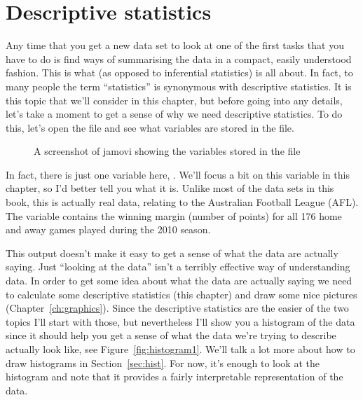 
\chapter{Descriptive statistics\label{ch:descriptives}}

Any time that you get a new data set to look at one of the first tasks that you have to do is find ways of summarising the data in a compact, easily understood fashion. This is what  (as opposed to inferential statistics) is all about. In fact, to many people the term ``statistics'' is synonymous with descriptive statistics. It is this topic that we'll consider in this chapter, but before going into any details, let's take a moment to get a sense of why we need descriptive statistics. To do this, let's open the  file and see what variables are stored in the file.

\vspace{0.5cm}
\begin{figure}[htb]
\begin{center}
\caption{A screenshot of jamovi showing the variables stored in the  file}
\label{fig:aflsmall}
\HR
\end{center}
\end{figure}

In fact, there is just one variable here, . We'll focus a bit on this variable in this chapter, so I'd better tell you what it is. Unlike most of the data sets in this book, this is actually real data, relating to the Australian Football League (AFL). The  variable contains the winning margin (number of points) for all 176 home and away games played during the 2010 season. 

This output doesn't make it easy to get a sense of what the data are actually saying. Just ``looking at the data'' isn't a terribly effective way of understanding data. In order to get some idea about what the data are actually saying we need to calculate some descriptive statistics (this chapter) and draw some nice pictures (Chapter~\ref{ch:graphics}). Since the descriptive statistics are the easier of the two topics I'll start with those, but nevertheless I'll show you a histogram of the  data since it should help you get a sense of what the data we're trying to describe actually look like, see Figure~\ref{fig:histogram1}. We'll talk a lot more about how to draw histograms in Section~\ref{sec:hist}. For now, it's enough to look at the histogram and note that it provides a fairly interpretable representation of the  data.

